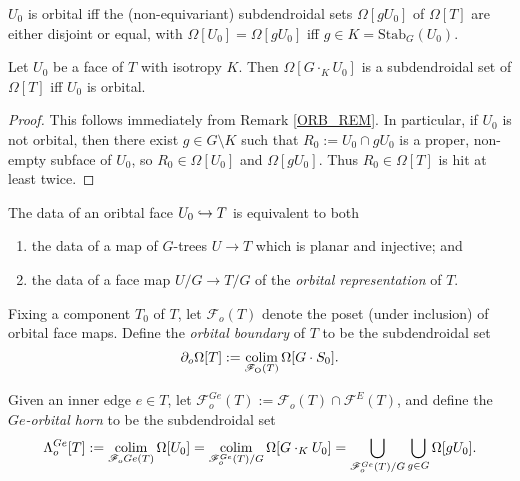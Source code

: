 \documentclass[a4paper,10pt,draft]{article}%
\begin{document}
\begin{remark}
      \label{ORB_REM}
      $U_0$ is orbital iff the (non-equivariant) subdendroidal sets $\Omega[g U_0]$ of $\Omega[T]$ are either
      disjoint or equal, with $\Omega[U_0] = \Omega[g U_0]$ iff $g \in K = \mathrm{Stab}_G(U_0)$.
\end{remark}


\begin{lemma}
      \label{ORB_INJ_LEM}
      Let $U_0$ be a face of $T$ with isotropy $K$.
      Then $\Omega[G \cdot_K U_0]$ is a subdendroidal set of $\Omega[T]$
      iff
      $U_0$ is orbital.
\end{lemma}

\begin{proof}
      This follows immediately from Remark \ref{ORB_REM}.
      In particular, 
      if $U_0$ is not orbital, then there exist $g \in G \setminus K$ such that
      $R_0 := U_0 \cap g U_0$ is a proper, non-empty subface of $U_0$, so $R_0 \in \Omega[U_0]$ and $\Omega[g U_0]$.
      Thus $R_0 \in \Omega[T]$ is hit at least twice.
\end{proof}

\begin{remark}
      The data of an oribtal face $U_0 \hookrightarrow T$ is equivalent to both
      \begin{enumerate}
      \item the data of a map of $G$-trees $U \to T$ which is planar and injective; and
      \item the data of a face map $U/G \to T/G$ of the \textit{orbital representation} of $T$.
      \end{enumerate}
\end{remark}

\begin{definition}
      Fixing a component $T_0$ of $T$,
      let $\mathscr{F}_{o}(T)$ denote the poset (under inclusion) of orbital face maps.
      Define the \textit{orbital boundary} of $T$ to be the subdendroidal set
      \begin{equation}
            \partial_{o}\Omega[T] := \mathop{\operatorname{colim}}\limits_{\mathscr{F}_{\mathrm{O}}(T)}\Omega[G \cdot S_0].
      \end{equation}
      
      Given an inner edge $e \in T$, let
      $\mathscr{F}_{o}^{Ge}(T) := \mathscr{F}_{o}(T) \cap \mathscr{F}^E(T)$,
      and define the \textit{$Ge$-orbital horn} to be the subdendroidal set
      \begin{equation}
            \Lambda^{Ge}_{o}[T] :=
            \mathop{\operatorname{colim}}\limits_{\mathscr{F}_o{Ge}(T)}\Omega[U_0]
            = \mathop{\operatorname{colim}}\limits_{\mathscr{F}_{o}^{Ge}(T)/G}\Omega[G\cdot_K U_0]
            = \mathop{\bigcup}\limits_{\mathscr{F}_o^{Ge}(T)/G} \mathop{\bigcup}\limits_{g \in G}\Omega[g U_0]. 
      \end{equation}
\end{definition}
\end{document}
